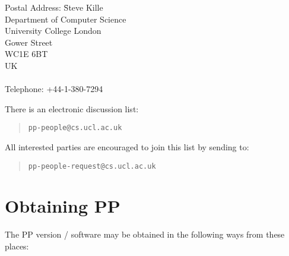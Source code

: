 \begin {tabbing}
Postal Address: \= Steve Kille \\
\> Department of Computer Science \\
\> University College London \\
\> Gower Street \\
\> WC1E 6BT \\
\> UK \\ \\
Telephone: \> +44-1-380-7294 \\
\end {tabbing}


There is an electronic discussion list: 

\begin {quote}
\verb|pp-people@cs.ucl.ac.uk|
\end {quote}

All interested parties are encouraged to join this list by sending to:

\begin {quote}
\verb|pp-people-request@cs.ucl.ac.uk|
\end {quote}


\chapter {Obtaining PP}

The PP version \ppversion/ software may be obtained in the following
ways from these places:





